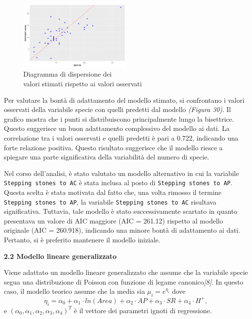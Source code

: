 \documentclass{article} %
\begin{document}
\begin{figure}[H]
    \centering
    \includegraphics[width=0.5\textwidth]{immagini/res_val_oss_lm.png}
    \captionsetup{justification=centering}
    \caption{Diagramma di dispersione dei \\valori stimati rispetto ai valori osservati}
\end{figure}

Per valutare la bontà di adattamento del modello stimato, si confrontano i valori osservati della variabile specie con quelli predetti dal modello \textit{(Figura 30)}. Il grafico mostra che i punti si distribuiscono principalmente lungo la bisettrice. Questo suggerisce un buon adattamento complessivo del modello ai dati. La correlazione tra i valori osservati e quelli predetti è pari a 0.722, indicando una forte relazione positiva. Questo risultato suggerisce che il modello riesce a spiegare una parte significativa della variabilità del numero di specie.

Nel corso dell'analisi, è stato valutato un modello alternativo in cui la variabile \texttt{Stepping stones to AC} è stata inclusa al posto di \texttt{Stepping stones to AP}. Questa scelta è stata motivata dal fatto che, una volta rimosso il termine \texttt{Stepping stones to AP}, la variabile \texttt{Stepping stones to AC} risultava significativa. Tuttavia, tale modello è stato successivamente scartato in quanto presentava un valore di AIC maggiore (AIC = 261.12) rispetto al modello originale (AIC = 260.918), indicando una minore bontà di adattamento ai dati. Pertanto, si è preferito mantenere il modello iniziale.

\vskip 20pt
\begin{flushleft}
    \textbf{\Large 2.2 \: Modello lineare generalizzato}
\end{flushleft}
\vskip 10pt

Viene adattato un modello lineare generalizzato che assume che la variabile specie segua una distribuzione di Poisson con funzione di legame canonico\textit{[8]}. In questo caso, il modello teorico assume che la media sia $\mu_i=e^{\eta_i}$ dove
\[
\eta_i=\alpha_0+\alpha_1 \cdot ln(Area)+\alpha_2\cdot AP +\alpha_3\cdot SR+\alpha_4\cdot H^+ ,
\]
e $(\alpha_0,\alpha_1,\alpha_2,\alpha_3,\alpha_4)^T$ è il vettore dei parametri ignoti di regressione.
\end{document}
